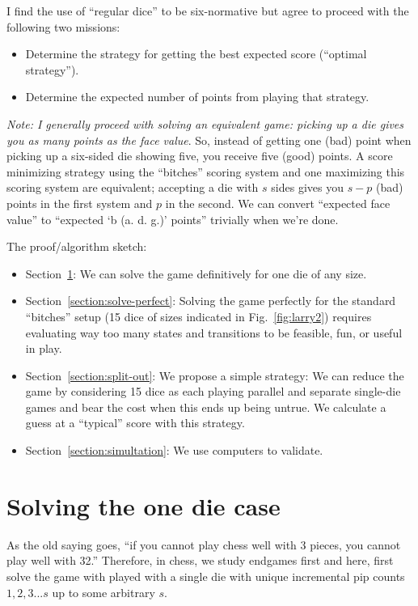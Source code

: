 \documentclass[11pt, oneside]{article} 	%
\begin{document}
I find the use of ``regular dice'' to be six-normative but agree to proceed with the following two missions:
\begin{itemize}
\item Determine the strategy for getting the best expected score (``optimal strategy'').
\item Determine the expected number of points from playing that strategy.
\end{itemize}

\emph{Note: I generally proceed with solving an equivalent game: picking up a die gives you as many points as the face value}.  So, instead of getting one (bad) point when picking up a six-sided die showing five, you receive five (good) points.  A score minimizing strategy using the ``bitches'' scoring system and one maximizing this scoring system are equivalent; accepting a die with $s$ sides gives you $s-p$ (bad) points in the first system and $p$ in the second.  We can convert ``expected face value'' to ``expected `b (a. d. g.)' points'' trivially when we're done.


The proof/algorithm sketch:
\begin{itemize}
\item Section~\ref{section:solve-one}: We can solve the game definitively for one die of any size.
\item Section~\ref{section:solve-perfect}: Solving the game perfectly for the standard ``bitches'' setup (15 dice of sizes indicated in Fig.~\ref{fig:larry2}) requires evaluating way too many states and transitions to be feasible, fun, or useful in play.
\item Section~\ref{section:split-out}: We propose a simple strategy: We can reduce the game by considering 15 dice as each playing parallel and separate single-die games and bear the cost when this ends up being untrue.  We calculate a guess at a ``typical'' score with this strategy.
\item Section~\ref{section:simultation}: We use computers to validate.
\end{itemize}

\section{Solving the one die case} \label{section:solve-one}

As the old saying goes, ``if you cannot play chess well with 3 pieces, you cannot play well with 32.''  Therefore, in chess, we study endgames first and here, first solve the game with played with a single die with unique incremental pip counts $1, 2, 3 ... s$ up to some arbitrary $s$.
\end{document}
